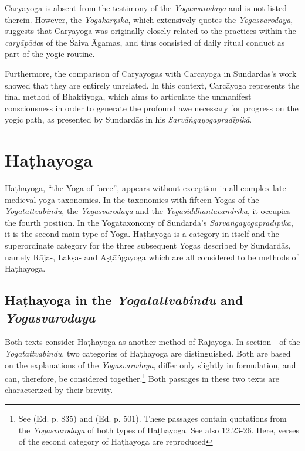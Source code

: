 Caryāyoga is absent from the testimony of the \textit{Yogasvarodaya} and is not listed therein. However, the \textit{Yogakarṇikā}, which extensively quotes the \textit{Yogasvarodaya}, suggests that Caryāyoga was originally closely related to the practices within the \textit{caryāpāda}s of the Śaiva Āgamas, and thus consisted of daily ritual conduct as part of the yogic routine.

Furthermore, the comparison of Caryāyogas with Carcāyoga in Sundardās’s work showed that they are entirely unrelated. In this context, Carcāyoga represents the final method of Bhaktiyoga, which aims to articulate the unmanifest consciousness in order to generate the profound awe necessary for progress on the yogic path, as presented by Sundardās in his \textit{Sarvāṅgayogapradīpikā}.

\section{Haṭhayoga}
\label{hathayogaintro}

Haṭhayoga, ``the Yoga of force'', appears without exception in all complex late medieval yoga taxonomies. In the taxonomies with fifteen Yogas of the \textit{Yogatattvabindu}, the \textit{Yogasvarodaya} and the \textit{Yogasiddhāntacandrikā}, it occupies the fourth position. In the Yogataxonomy of Sundardā's \textit{Sarvāṅgayogapradīpikā}, it is the second main type of Yoga. Haṭhayoga is a category in itself and the superordinate category for the three subsequent Yogas described by Sundardās, namely Rāja-, Lakṣa- and Aṣṭāṅgayoga which are all considered to be methods of Haṭhayoga. 

\subsection{Haṭhayoga in the \textit{Yogatattvabindu} and \textit{Yogasvarodaya}}

Both texts consider Haṭhayoga as another method of Rājayoga. In section - of the \textit{Yogatattvabindu}, two categories of Haṭhayoga are distinguished. Both are based on the explanations of the \textit{Yogasvarodaya}, differ only slightly in formulation, and can, therefore, be considered together.\footnote{See  (Ed. p. 835) and  (Ed. p. 501). These passages contain quotations from the \textit{Yogasvarodaya} of both types of Haṭhayoga. See also  12.23-26. Here, verses of the second category of Haṭhayoga are reproduced} Both passages in these two texts are characterized by their brevity. 

